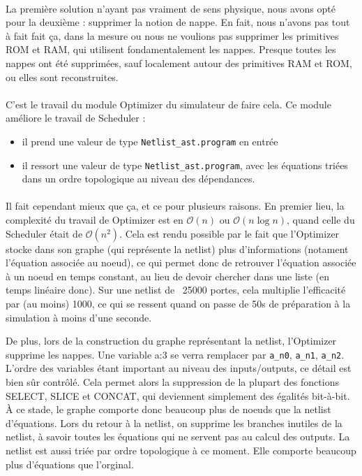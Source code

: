 \documentclass{article}
\begin{document}
\paragraph{}La première solution n'ayant pas vraiment de sens physique, nous avons opté pour la deuxième : supprimer la notion de nappe.
En  fait, nous n'avons pas tout à fait fait ça, dans la mesure ou nous ne  voulions pas supprimer les primitives ROM et RAM, qui utilisent  fondamentalement les nappes.
Presque toutes les nappes ont été supprimées, sauf localement autour des primitives RAM et ROM, ou elles sont reconstruites.

\paragraph{}C'est le travail du module Optimizer du simulateur de faire cela. Ce module améliore le travail de Scheduler :
\begin{itemize}
	\item il prend une valeur de type \texttt{Netlist\_ast.program} en entrée
	\item il ressort une valeur de type \texttt{Netlist\_ast.program}, avec les équations  triées dans un ordre topologique au niveau des dépendances.
\end{itemize}

\paragraph{}Il fait cependant mieux que ça, et ce pour plusieurs raisons.
En premier lieu, la complexité du travail de Optimizer est  en $\mathcal O(n)$ ou $\mathcal O(n\log n)$, quand celle du Scheduler était de $\mathcal O(n^2)$. Cela  est rendu possible par le fait que l'Optimizer stocke dans son graphe  (qui représente la netlist) plus d'informations (notament l'équation  associée au noeud), ce qui permet donc de retrouver l'équation associée à  un noeud en temps constant, au lieu de devoir chercher dans une liste  (en temps linéaire donc). Sur une netlist de ~25000 portes, cela  multiplie l'efficacité par (au moins) 1000, ce qui se ressent quand on  passe de 50s de préparation à la simulation à moins d'une seconde.

De plus, lors de la construction du graphe représentant la netlist,  l'Optimizer supprime les nappes. Une variable a:3 se verra remplacer par \texttt{a\_n0}, \texttt{a\_n1}, \texttt{a\_n2}. L'ordre  des variables étant important au niveau des inputs/outputs, ce détail  est bien sûr  contrôlé. Cela permet alors la suppression de la plupart des fonctions  SELECT, SLICE et CONCAT, qui deviennent simplement des égalités  bit-à-bit. À ce stade, le graphe comporte donc beaucoup plus de noeuds  que la netlist d'équations.
Lors  du retour à la netlist, on supprime les branches inutiles de la  netlist, à savoir toutes les équations qui ne servent pas au calcul des  outputs. La netlist est aussi triée par ordre topologique à ce moment.  Elle comporte beaucoup plus d'équations que l'orginal.
\end{document}
